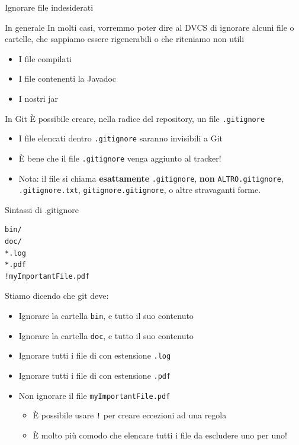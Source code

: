 \documentclass[presentation]{beamer}
\begin{document}
\begin{frame}{Ignorare file indesiderati}
	\begin{block}{In generale}
		In molti casi, vorremmo poter dire al DVCS di ignorare alcuni file o cartelle, che sappiamo 
essere rigenerabili o che riteniamo non utili
		\begin{itemize}
			\item I file compilati
			\item I file contenenti la Javadoc
			\item I nostri jar
		\end{itemize}
	\end{block}
	\begin{block}{In Git}
		È possibile creare, nella radice del repository, un file \texttt{.gitignore}
		\begin{itemize}
			\item I file elencati dentro \texttt{.gitignore} saranno invisibili a Git
			\item È bene che il file \texttt{.gitignore} venga aggiunto al tracker!
			\item Nota: il file si chiama \textbf{esattamente} \texttt{.gitignore}, \textbf{non} 
\texttt{ALTRO.gitignore}, \texttt{.gitignore.txt}, \texttt{gitignore.gitignore}, o altre stravaganti 
forme.
		\end{itemize}
	\end{block}
	\begin{block}{Sintassi di .gitignore}
		\begin{Verbatim}[fontsize=\scriptsize]
bin/
doc/
*.log
*.pdf
!myImportantFile.pdf
		\end{Verbatim}
		Stiamo dicendo che git deve:
		\begin{itemize}
			\item Ignorare la cartella \texttt{bin}, e tutto il suo contenuto
			\item Ignorare la cartella \texttt{doc}, e tutto il suo contenuto
			\item Ignorare tutti i file di con estensione \texttt{.log}
			\item Ignorare tutti i file di con estensione \texttt{.pdf}
			\item Non ignorare il file \texttt{myImportantFile.pdf}
			\begin{itemize}
				\item È possibile usare \texttt{!} per creare eccezioni ad una regola
				\item È molto più comodo che elencare tutti i file da escludere uno per uno!

\end{itemize}
\end{itemize}
\end{block}
\end{frame}
\end{document}
